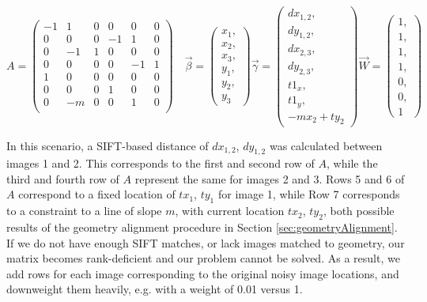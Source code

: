 \documentclass[]{spie}  %
\begin{document}
\[
A =
\begin{pmatrix}
  -1 & 1 & 0 & 0 & 0 & 0\\
  0 & 0 & 0 & -1 & 1 & 0\\
  0 & -1 & 1 & 0 & 0 & 0\\
  0 & 0 & 0 & 0 & -1 & 1\\
  1 & 0 & 0 & 0 & 0 & 0\\
  0 & 0 & 0 & 1 & 0 & 0\\
  0 & -m & 0 & 0 & 1 & 0\\
\end{pmatrix}\quad
\vec{\beta} =
\begin{pmatrix}
  x_1, \\ x_2, \\ x_3, \\ y_1, \\ y_2, \\ y_3
\end{pmatrix}
\vec{\gamma} =
\begin{pmatrix}
  dx_{1,2}, \\ dy_{1,2}, \\ dx_{2,3}, \\ dy_{2,3}, \\ t1_x, \\ t1_y,
  \\ -mx_2 + ty_2
\end{pmatrix}
\vec{W} = 
\begin{pmatrix}
  1, \\ 1, \\ 1, \\ 1, \\ 0, \\ 0, \\ 1
\end{pmatrix}
\]


In this scenario, a SIFT-based distance of $dx_{1,2}$, $dy_{1,2}$ was
calculated between images 1 and 2. This corresponds to the first and
second row of $A$, while the third and fourth row of $A$ represent the
same for images 2 and 3. Rows 5 and 6 of $A$ correspond to a fixed
location of $tx_1$, $ty_1$ for image 1, while Row 7 corresponds to a
constraint to a line of slope $m$, with current location $tx_2$,
$ty_2$, both possible results of the geometry alignment procedure in
Section \ref{sec:geometryAlignment}. If we do not have enough SIFT
matches, or lack images matched to geometry, our matrix becomes
rank-deficient and our problem cannot be solved. As a result, we add
rows for each image corresponding to the original noisy image
locations, and downweight them heavily, e.g. with a weight of 0.01
versus 1.
\end{document}
